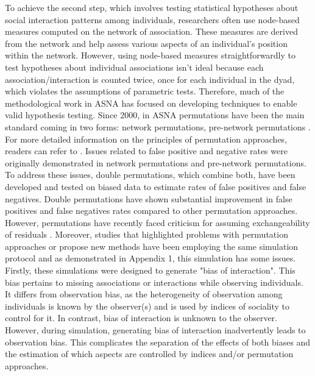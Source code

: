 \documentclass[Afour,sageh,times]{sagej}
\begin{document}
To achieve the second step, which involves testing statistical hypotheses about social interaction patterns among individuals, researchers often use node-based measures computed on the network of association. These measures are derived from the network and help assess various aspects of an individual's position within the network. However, using node-based measures straightforwardly to test hypotheses about individual associations isn't ideal because each association/interaction is counted twice, once for each individual in the dyad, which violates the assumptions of parametric tests. Therefore, much of the methodological work in ASNA has focused on developing techniques to enable valid hypothesis testing. Since 2000, in ASNA permutations have been the main standard coming in two forms: network permutations, pre-network permutations \citep{Farine2013}. For more detailed information on the principles of permutation approaches, readers can refer to \citep{Farine2013, sosa2021reliable}. Issues related to false positive and negative rates were originally demonstrated in network permutations and pre-network permutations. To address these issues, double permutations, which combine both, have been developed and tested on biased data to estimate rates of false positives and false negatives. Double permutations have shown substantial improvement in false positives and false negatives rates compared to other permutation approaches. However, permutations have recently faced criticism for assuming exchangeability of residuals \citep{Hart2022}. Moreover, studies that highlighted problems with permutation approaches or propose new methods have been employing the same simulation protocol and as demonstrated in Appendix 1, this simulation has some issues. Firstly, these simulations were designed to generate "bias of interaction". This bias pertains to missing associations or interactions while observing individuals. It differs from observation bias, as the heterogeneity of observation among individuals is known by the observer(s) and is used by indices of sociality to control for it. In contrast, bias of interaction is unknown to the observer. However, during simulation, generating bias of interaction inadvertently leads to observation bias. This complicates the separation of the effects of both biases and the estimation of which aspects are controlled by indices and/or permutation approaches. 
\end{document}
